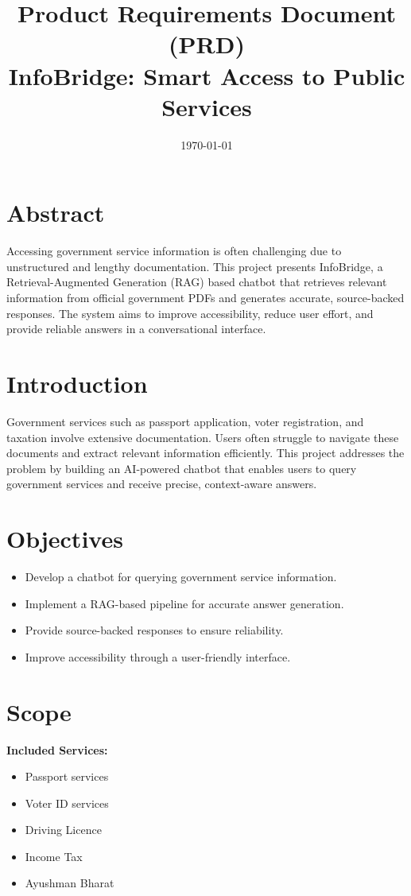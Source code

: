 \documentclass[11pt]{article}
\title{\textbf{Product Requirements Document (PRD)}\\
InfoBridge: Smart Access to Public Services}
\date{\today}
\begin{document}
\maketitle

\section{Abstract}
Accessing government service information is often challenging due to unstructured and lengthy documentation. This project presents InfoBridge, a Retrieval-Augmented Generation (RAG) based chatbot that retrieves relevant information from official government PDFs and generates accurate, source-backed responses. The system aims to improve accessibility, reduce user effort, and provide reliable answers in a conversational interface.

\section{Introduction}
Government services such as passport application, voter registration, and taxation involve extensive documentation. Users often struggle to navigate these documents and extract relevant information efficiently. This project addresses the problem by building an AI-powered chatbot that enables users to query government services and receive precise, context-aware answers.

\section{Objectives}
\begin{itemize}
    \item Develop a chatbot for querying government service information.
    \item Implement a RAG-based pipeline for accurate answer generation.
    \item Provide source-backed responses to ensure reliability.
    \item Improve accessibility through a user-friendly interface.
\end{itemize}

\section{Scope}
\textbf{Included Services:}
\begin{itemize}
    \item Passport services
    \item Voter ID services
    \item Driving Licence
    \item Income Tax
    \item Ayushman Bharat
\end{itemize}
\end{document}

